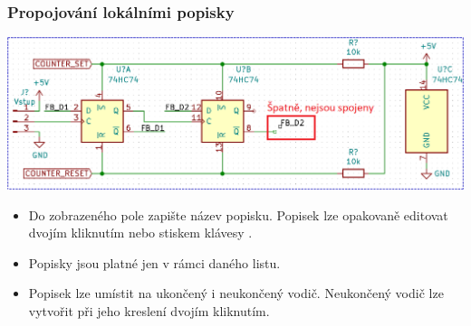 \documentclass{beamer}
\begin{document}
\begin{frame}
	\frametitle{Propojování lokálními popisky}
	
	\begin{center}
		\includegraphics[width=\textwidth]{obr/spoje06.png}
	\end{center}
	
	\small
	
	\begin{itemize}
		\item Do zobrazeného pole zapište název popisku. Popisek lze opakovaně editovat dvojím kliknutím nebo stiskem klávesy .
		\item Popisky jsou platné jen v rámci daného listu.
		\item Popisek lze umístit na ukončený i neukončený vodič. Neukončený vodič lze vytvořit při jeho kreslení dvojím kliknutím.
	\end{itemize}
	
\end{frame}


\end{document}
